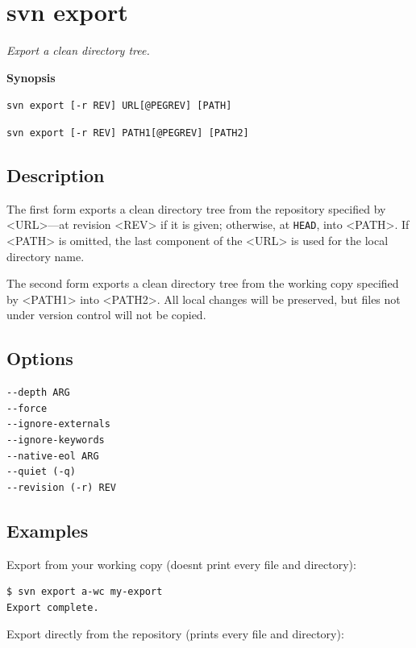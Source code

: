 \section{svn export}\label{svn.ref.svn.c.export}

\emph{Export a clean directory tree.}

\textbf{Synopsis}

\texttt{svn\ export\ {[}-r\ REV{]}\ URL{[}@PEGREV{]}\ {[}PATH{]}}

\texttt{svn\ export\ {[}-r\ REV{]}\ PATH1{[}@PEGREV{]}\ {[}PATH2{]}}

\subsection{Description}

The first form exports a clean directory tree from the repository
specified by \textless URL\textgreater---at revision
\textless REV\textgreater{} if it is given; otherwise, at \texttt{HEAD},
into \textless PATH\textgreater. If \textless PATH\textgreater{} is
omitted, the last component of the \textless URL\textgreater{} is used
for the local directory name.

The second form exports a clean directory tree from the working copy
specified by \textless PATH1\textgreater{} into
\textless PATH2\textgreater. All local changes will be preserved, but
files not under version control will not be copied.

\subsection{Options}

\begin{verbatim}
--depth ARG
--force
--ignore-externals
--ignore-keywords
--native-eol ARG
--quiet (-q)
--revision (-r) REV
\end{verbatim}

\subsection{Examples}

Export from your working copy (doesn\textquotesingle t print every file
and directory):

\begin{verbatim}
$ svn export a-wc my-export
Export complete.
\end{verbatim}

Export directly from the repository (prints every file and directory):

